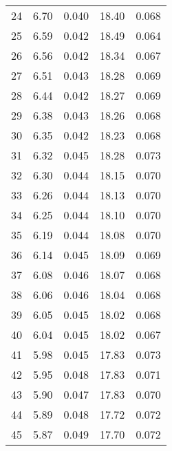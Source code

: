 \begin{table}
\begin{tabular}{c|ll|ll}
24 & 6.70 & 0.040 & 18.40 & 0.068 \\
25 & 6.59 & 0.042 & 18.49 & 0.064 \\
26 & 6.56 & 0.042 & 18.34 & 0.067 \\
27 & 6.51 & 0.043 & 18.28 & 0.069 \\
28 & 6.44 & 0.042 & 18.27 & 0.069 \\
29 & 6.38 & 0.043 & 18.26 & 0.068 \\
30 & 6.35 & 0.042 & 18.23 & 0.068 \\
31 & 6.32 & 0.045 & 18.28 & 0.073 \\
32 & 6.30 & 0.044 & 18.15 & 0.070 \\
33 & 6.26 & 0.044 & 18.13 & 0.070 \\
34 & 6.25 & 0.044 & 18.10 & 0.070 \\
35 & 6.19 & 0.044 & 18.08 & 0.070 \\
36 & 6.14 & 0.045 & 18.09 & 0.069 \\
37 & 6.08 & 0.046 & 18.07 & 0.068 \\
38 & 6.06 & 0.046 & 18.04 & 0.068 \\
39 & 6.05 & 0.045 & 18.02 & 0.068 \\
40 & 6.04 & 0.045 & 18.02 & 0.067 \\
41 & 5.98 & 0.045 & 17.83 & 0.073 \\
42 & 5.95 & 0.048 & 17.83 & 0.071 \\
43 & 5.90 & 0.047 & 17.83 & 0.070 \\
44 & 5.89 & 0.048 & 17.72 & 0.072 \\
45 & 5.87 & 0.049 & 17.70 & 0.072 \\
               \hline
        \end{tabular}
    \end{table}
    \clearpage

